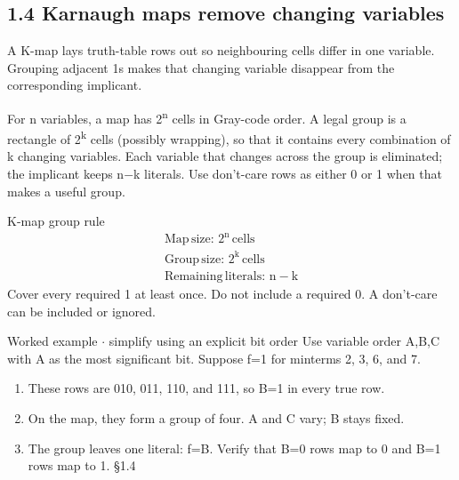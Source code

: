 \documentclass[11pt]{article}
\begin{document}
\begin{keepsection}
\section{1.4 Karnaugh maps remove changing variables}

A K-map lays truth-table rows out so neighbouring cells differ in one variable. Grouping adjacent 1s makes that changing variable disappear from the corresponding implicant.

For n variables, a map has 2\textsuperscript{n} cells in Gray-code order. A legal group is a rectangle of 2\textsuperscript{k} cells (possibly wrapping), so that it contains every combination of k changing variables. Each variable that changes across the group is eliminated; the implicant keeps n\ensuremath{-}k literals. Use don’t-care rows as either 0 or 1 when that makes a useful group.

\begin{equationcard}{K-map group rule}
\[ \begin{gathered} \text{Map}\, \text{size}:\, 2^{\mathrm{n}}\, \text{cells} \\ \text{Group}\, \text{size}:\, 2^{\mathrm{k}}\, \text{cells} \\ \text{Remaining}\, \text{literals}:\, \mathrm{n}-\mathrm{k} \end{gathered} \]
{\small Cover every required 1 at least once. Do not include a required 0. A don’t-care can be included or ignored.}
\end{equationcard}

\begin{workedbox}{Worked example \ensuremath{\cdot} simplify using an explicit bit order}
Use variable order A,B,C with A as the most significant bit. Suppose f=1 for minterms 2, 3, 6, and 7.

\begin{enumerate}
\item These rows are 010, 011, 110, and 111, so B=1 in every true row.
\item On the map, they form a group of four. A and C vary; B stays fixed.
\item The group leaves one literal: f=B. Verify that B=0 rows map to 0 and B=1 rows map to 1. \hfill{\small\color{FAUblue}§1.4}
\end{enumerate}
\end{workedbox}


\end{keepsection}
\end{document}
